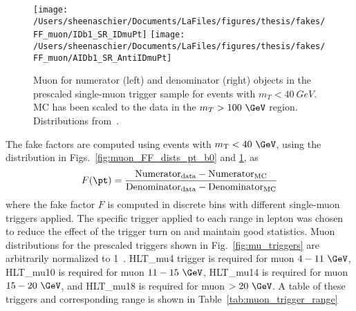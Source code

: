 \begin{figure}[tbp]
  \centering
  \texttt{[image: /Users/sheenaschier/Documents/LaFiles/figures/thesis/fakes/FF\_muon/IDb1\_SR\_IDmuPt]}
  \texttt{[image: /Users/sheenaschier/Documents/LaFiles/figures/thesis/fakes/FF\_muon/AIDb1\_SR\_AntiIDmuPt]}
  \caption{Muon \pt{} for numerator (left) and denominator (right) objects in the prescaled single-muon trigger sample for events with $m_{T}< 40~ GeV$.  MC has been scaled to the data in the $m_{T} > 100~\GeV$ region. Distributions from~\cite{Boerner:2231917}.}
  \label{fig:muon_FF_dists_pt_b1}
\end{figure}


The fake factors are computed using events with $m_{\mathrm{T}}<40~\GeV$, using the distribution in Figs.~\ref{fig:muon_FF_dists_pt_b0} and \ref{fig:muon_FF_dists_pt_b1}, as
\begin{equation}
  F(\pt) = \frac{\mathrm{Numerator}_{\mathrm{data}} - \mathrm{Numerator}_{\mathrm{MC}}}{\mathrm{Denominator}_{\mathrm{data}} - \mathrm{Denominator}_{\mathrm{MC}}}
\end{equation}
where the fake factor $F$ is computed in discrete \pt{} bins with different single-muon triggers applied. The specific trigger applied to each range in lepton \pt{} was chosen to reduce the effect of the trigger turn on and maintain good statistics. Muon \pt{} distributions for the prescaled triggers shown in Fig.~\ref{fig:mu_triggers} are arbitrarily normalized to 1~\ipb.  HLT\_mu4 trigger is required for muon \pt{} $4 - 11~ \GeV$, HLT\_mu10 is required for muon \pt{} $11- 15~\GeV$, HLT\_mu14 is required for muon \pt{} $15-20~\GeV$, and HLT\_mu18 is required for muon \pt{} $>20~\GeV$. A table of these triggers and corresponding \pt{} range is shown in Table~\ref{tab:muon_trigger_range}  %


